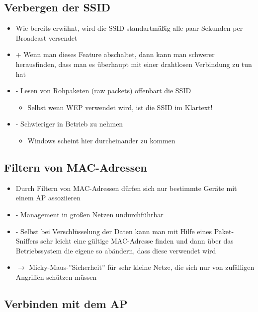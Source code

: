 \documentclass[openany]{book}
\begin{document}
\subsection{Verbergen der SSID}

\begin{itemize}
    \item Wie bereits erwähnt, wird die SSID standartmäßig alle paar Sekunden per Broadcast versendet
    \item + Wenn man dieses Feature abschaltet, dann kann man schwerer herausfinden, dass man es überhaupt mit einer drahtlosen Verbindung zu tun hat
    \item - Lesen von Rohpaketen (raw packets) offenbart die SSID
    \begin{itemize}
        \item Selbst wenn WEP verwendet wird, ist die SSID im Klartext!
    \end{itemize}
    \item - Schwieriger in Betrieb zu nehmen
    \begin{itemize}
        \item Windows scheint hier durcheinander zu kommen
    \end{itemize}
\end{itemize}

\subsection{Filtern von MAC-Adressen}

\begin{itemize}
    \item Durch Filtern von MAC-Adressen dürfen sich nur bestimmte Geräte mit einem AP assoziieren
    \item - Management in großen Netzen undurchführbar
    \item - Selbst bei Verschlüsselung der Daten kann man mit Hilfe eines Paket-Sniffers sehr leicht eine gültige MAC-Adresse finden und dann über das Betriebssystem die eigene so abändern, dass diese verwendet wird
    \item $\rightarrow$ Micky-Maus-''Sicherheit'' für sehr kleine Netze, die sich nur von zufälligen Angriffen schützen müssen
\end{itemize}

\subsection{Verbinden mit dem AP}
\end{document}
